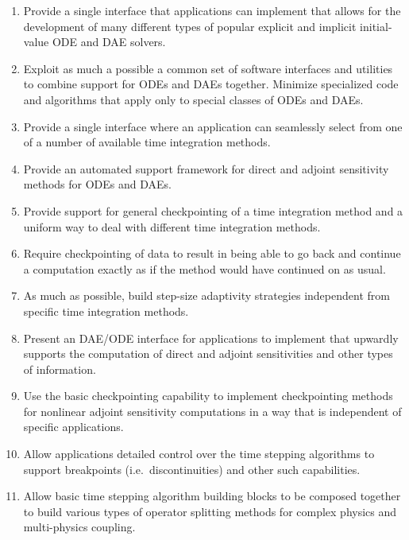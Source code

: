 \documentclass[pdf,ps2pdf,11pt]{SANDreport}
\begin{document}
\begin{enumerate}

{}\item Provide a single interface that applications can implement that allows
for the development of many different types of popular explicit and implicit
initial-value ODE and DAE solvers.

{}\item Exploit as much a possible a common set of software interfaces and
utilities to combine support for ODEs and DAEs together.  Minimize specialized
code and algorithms that apply only to special classes of ODEs and DAEs.

{}\item Provide a single interface where an application can seamlessly select
from one of a number of available time integration methods.

{}\item Provide an automated support framework for direct and adjoint
sensitivity methods for ODEs and DAEs.

{}\item Provide support for general checkpointing of a time integration method
and a uniform way to deal with different time integration methods.

{}\item Require checkpointing of data to result in being able to go back and
continue a computation exactly as if the method would have continued on as
usual.

{}\item As much as possible, build step-size adaptivity strategies independent
from specific time integration methods.

{}\item Present an DAE/ODE interface for applications to implement that
upwardly supports the computation of direct and adjoint sensitivities and
other types of information.

{}\item Use the basic checkpointing capability to implement checkpointing
methods for nonlinear adjoint sensitivity computations in a way that is
independent of specific applications.

{}\item Allow applications detailed control over the time stepping algorithms
to support breakpoints (i.e.\ discontinuities) and other such capabilities.

{}\item Allow basic time stepping algorithm building blocks to be composed
together to build various types of operator splitting methods for complex
physics and multi-physics coupling.

\end{enumerate}
\end{document}
